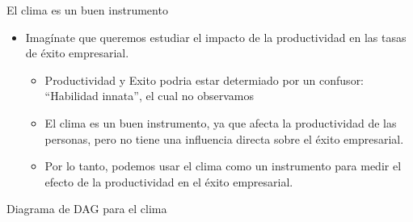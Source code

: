 \documentclass{beamer}
\begin{document}




\begin{frame}{El clima es un buen instrumento}

\begin{itemize}
\item Imagínate que queremos estudiar el impacto de la productividad en las tasas de éxito empresarial.
\begin{itemize}
    \item Productividad y Exito podria estar determiado por un confusor: ``Habilidad innata'', el cual no observamos
    \item El clima es un buen instrumento, ya que afecta la productividad de las personas, pero no tiene una influencia directa sobre el éxito empresarial.
    \item Por lo tanto, podemos usar el clima como un instrumento para medir el efecto de la productividad en el éxito empresarial.
\end{itemize}
\end{itemize}
\end{frame}

\begin{frame}{Diagrama de DAG para el clima}

\begin{center}
\begin{minipage}{.5\textwidth}
\begin{center}
\end{center}
\end{minipage}
\end{center}

\end{frame}
\end{document}
